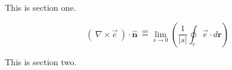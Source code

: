 This is section one.

\begin{equation}
(~\nabla \times \vec{e}~) \cdot \mathbf{\hat{n}} \
        \overset{\underset{\mathrm{def}}{}}{=}
    \lim_{s \to 0}\left( \frac{1}{|s|}\oint_{c} \vec{e} \cdot d\mathbf{r}\right)
\end{equation}

This is section two.